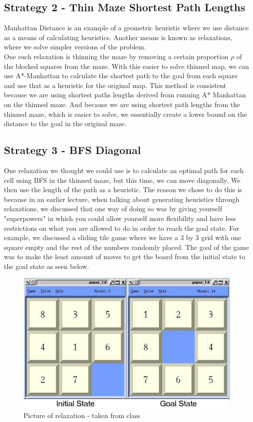 \documentclass[11pt]{scrartcl} %
\begin{document}
\subsection{Strategy 2 - Thin Maze Shortest Path Lengths}

Manhattan Distance is an example of a geometric heuristic where we use distance as a means of calculating heuristics. Another means is known as relaxations, where we solve simpler versions of the problem. \vspace{2em}\\
One such relaxation is thinning the maze by removing a certain proportion $\rho$ of the blocked squares from the maze. With this easier to solve thinned map, we can use A*-Manhattan to calculate the shortest path to the goal from each square and use that as a heuristic for the original map. This method is consistent because we are using shortest paths lengths derived from running A* Manhattan on the thinned maze. And because we are using shortest path lengths from the thinned maze, which is easier to solve, we essentially create a lower bound on the distance to the goal in the original maze.

\subsection{Strategy 3 - BFS Diagonal} 

One relaxation we thought we could use is to calculate an optimal path for each cell using BFS in the thinned maze, but this time, we can move diagonally. We then use the length of the path as a heuristic. The reason we chose to do this is because in an earlier lecture, when talking about generating heuristics through relaxations, we discussed that one way of doing so was by giving yourself "superpowers" in which you could allow yourself more flexibility and have less restrictions on what you are allowed to do in order to reach the goal state. For example, we discussed a sliding tile game where we have a 3 by 3 grid with one square empty and the rest of the numbers randomly placed. The goal of the game was to make the least amount of moves to get the board from the initial state to the goal state as seen below.

\begin{figure}[H]
  	\centering
  	\includegraphics[scale=0.3]{class.jpg}
	\caption{Picture of relaxation - taken from class}
	\label{fig:example}
  \end{figure}
 
\end{document}
